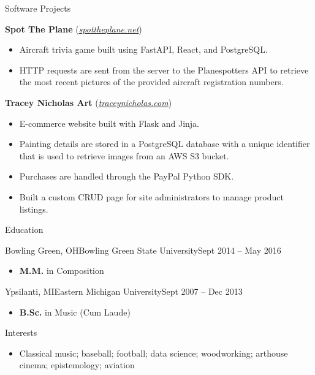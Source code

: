 \documentclass[calibri]{mcdowellcv}
\begin{document}
	\begin{cvsection}{Software Projects}
		\begin{cvsubsection}{}{}{}
			\textbf{Spot The Plane} (\textit{{\color{blue}\href{https://www.spottheplane.net/}{spottheplane.net}}})
			\begin{itemize}
				\item Aircraft trivia game built using FastAPI, React, and PostgreSQL.
				\item HTTP requests are sent from the server to the Planespotters API to retrieve the most recent pictures of the provided aircraft registration numbers.
			\end{itemize}
		\end{cvsubsection}

		\begin{cvsubsection}{}{}{}
			\textbf{Tracey Nicholas Art} (\textit{{\color{blue}\href{https://www.traceynicholas.com/}{traceynicholas.com}}})
			\begin{itemize}
				\item E-commerce website built with Flask and Jinja.
				\item Painting details are stored in a PostgreSQL database with a unique identifier that is used to retrieve images from an AWS S3 bucket.
				\item Purchases are handled through the PayPal Python SDK.
				\item Built a custom CRUD page for site administrators to manage product listings.
			\end{itemize}
		\end{cvsubsection}
	\end{cvsection}
	
	\begin{cvsection}{Education}
		\begin{cvsubsection}{Bowling Green, OH}{Bowling Green State University}{Sept 2014 -- May 2016}
			\begin{itemize}
				\item \textbf{M.M.} in Composition
			\end{itemize}
		\end{cvsubsection}
		\begin{cvsubsection}{Ypsilanti, MI}{Eastern Michigan University}{Sept 2007 -- Dec 2013}
			\begin{itemize}
				\item \textbf{B.Sc.} in Music (Cum Laude)
			\end{itemize}
		\end{cvsubsection}
	\end{cvsection}

	\begin{cvsection}{Interests}
		\begin{cvsubsection}{}{}{}
			\begin{itemize}
				\item Classical music; baseball; football; data science; woodworking; arthouse cinema; epistemology; aviation
			\end{itemize}
		\end{cvsubsection}
	\end{cvsection}
\end{document}
